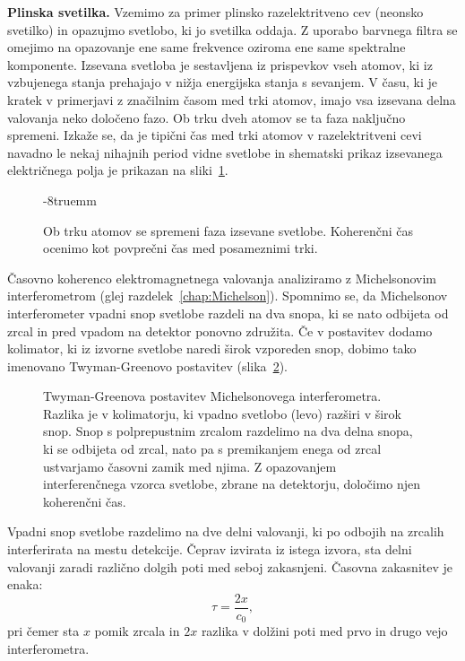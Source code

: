 \begin{example}{\bf Plinska svetilka.}
Vzemimo za primer plinsko razelektritveno cev (neonsko svetilko) in 
opazujmo svetlobo, ki jo svetilka oddaja. Z uporabo barvnega 
filtra se omejimo na opazovanje ene same frekvence oziroma 
ene same spektralne komponente. Izsevana svetloba je sestavljena iz
prispevkov vseh atomov, ki iz vzbujenega stanja prehajajo v 
nižja energijska stanja s sevanjem. V času, ki je kratek v primerjavi 
z značilnim časom med trki atomov, imajo vsa izsevana delna valovanja 
neko določeno fazo. Ob trku dveh atomov se ta faza naključno spremeni. 
Izkaže se, da je tipični čas med trki atomov v razelektritveni cevi 
navadno le nekaj nihajnih period vidne svetlobe in shematski prikaz
izsevanega električnega polja je prikazan na sliki~\ref{fig:08_neon}.
\begin{figure}[h!]
\centering
\def\svgwidth{80truemm} 

\caption{Ob trku atomov se spremeni faza izsevane svetlobe. Koherenčni
čas ocenimo kot povprečni čas med posameznimi trki.
}
\label{fig:08_neon}
\vglue-8truemm
\end{figure}

\end{example}

Časovno koherenco elektromagnetnega valovanja analiziramo 
z
Michelsonovim interferometrom (glej razdelek~\ref{chap:Michelson}). 
Spomnimo se, da Michelsonov interferometer vpadni snop 
svetlobe razdeli na dva snopa, ki se nato odbijeta od zrcal in pred 
vpadom na detektor ponovno združita. Če v postavitev dodamo kolimator, 
ki iz izvorne svetlobe naredi širok vzporeden snop, dobimo tako imenovano
Twyman-Greenovo postavitev (slika~\ref{fig:08_Twyman}).
\begin{figure}[ht]
\centering
\def\svgwidth{70truemm} 

\caption{Twyman-Greenova postavitev Michelsonovega interferometra. Razlika
je v kolimatorju, ki vpadno svetlobo (levo) razširi v širok snop. Snop s 
polprepustnim zrcalom razdelimo
na dva delna snopa, ki se odbijeta od zrcal, nato pa s premikanjem enega
od zrcal ustvarjamo časovni zamik med njima. Z opazovanjem 
interferenčnega vzorca svetlobe, zbrane na detektorju, določimo njen
koherenčni čas.
}
\label{fig:08_Twyman}
\end{figure}

Vpadni snop svetlobe razdelimo na dve delni valovanji, ki po odbojih na 
zrcalih interferirata na mestu detekcije. Čeprav izvirata iz istega 
izvora, sta delni valovanji zaradi različno dolgih poti med seboj zakasnjeni. 
Časovna zakasnitev je enaka:
\begin{equation}
\tau = \frac{2 x}{c_0},
\label{eq:08_05}
\end{equation}
pri čemer sta $x$ pomik zrcala in $2x$ razlika v dolžini poti med prvo in drugo 
vejo interferometra. 

